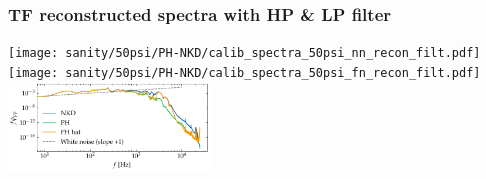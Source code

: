 \documentclass[aspectratio=169,9pt]{beamer}
\begin{document}
\begin{frame}
    \frametitle{TF reconstructed spectra with HP \& LP filter}
        \centering
        \texttt{[image: sanity/50psi/PH-NKD/calib\_spectra\_50psi\_nn\_recon\_filt.pdf]}
        \texttt{[image: sanity/50psi/PH-NKD/calib\_spectra\_50psi\_fn\_recon\_filt.pdf]}
        \includegraphics[width=0.4\textwidth]{sanity/50psi/PH-NKD/calib_spectra_50psi_an_filt_recon.pdf}
\end{frame}
\end{document}
